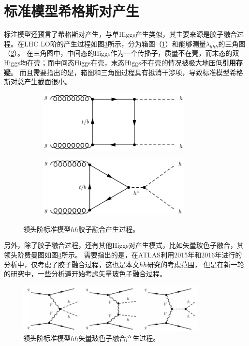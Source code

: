 \section{标准模型希格斯对产生}
标注模型还预言了希格斯对产生，与单Higgs产生类似，其主要来源是胶子融合过程。在LHC LO阶的产生过程如图\ref{fig:diagram_SMhh_ggF}所示，分为箱图（\ref{fig:diagram_SMhh_box}）和能够测量$\lambda_{hhh}$的三角图（\ref{fig:diagram_SMhh_triangle}）。
在三角图中，中间态的Higgs作为一个传播子，质量不在壳，而末态的双Higgs均在壳；而中间态Higgs在壳，末态Higgs不在壳的情况被极大地压低\cite{Patrignani:2016xqp}\textbf{引用存疑}。
而且需要指出的是，箱图和三角图过程具有抵消干涉项，导致标准模型希格斯对总产生截面很小。
\begin{figure}[h]
\centering
 \begin{subfigure}[b]{0.45\textwidth}
  \includegraphics[width=0.85\textwidth]{fig/SMhh_box.png}
  \caption{}
  \label{fig:diagram_SMhh_box}
 \end{subfigure}
 \begin{subfigure}[b]{0.45\textwidth}
  \includegraphics[width=0.85\textwidth]{fig/SMhh_triangle.png}
  \caption{}
  \label{fig:diagram_SMhh_triangle}
 \end{subfigure}
\caption{领头阶标准模型$hh$胶子融合产生过程。}
\label{fig:diagram_SMhh_ggF}
\end{figure}

另外，除了胶子融合过程，还有其他Higgs对产生模式，比如矢量玻色子融合，其领头阶费曼图如图\ref{fig:diagram_SMhh_VBF}所示。
需要指出的是，在ATLAS利用2015年和2016年进行的分析中，仅考虑了胶子融合过程，这也是本文$hh$研究的考虑范围，
但是在新一轮的研究中，一些分析道开始考虑矢量玻色子融合过程。
\begin{figure}[h]
\centering
  \includegraphics[width=0.85\textwidth]{fig/SMhh_VBF.png}
\caption{领头阶标准模型$hh$矢量玻色子融合产生过程。}
\label{fig:diagram_SMhh_VBF}
\end{figure}

